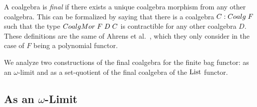 \documentclass[final,a4paper,USenglish,cleveref]{lipics-v2021}
\begin{document}
A coalgebra is \emph{final} if there exists a unique coalgebra morphism from any other coalgebra. This can be formalized by saying that there is a coalgebra $C : \Coalg\;F$ such that the type $\CoalgMor\;F\;D\;C$ is contractible for any other coalgebra $D$. These definitions are the same of Ahrens et al.~\cite{Ahrens2015}, which they only consider in the case of $F$ being a polynomial functor.

We analyze two constructions of the final coalgebra for the finite bag functor: as an $\omega$-limit %
and as a set-quotient of the final coalgebra of the $\List$ functor. %

\subsection{As an \ensuremath{\omega}-Limit}\label{sec:final-limit-set}
\end{document}
